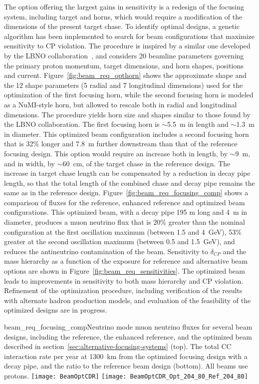 The option offering the largest gains in sensitivity is a redesign of
the focusing system, including target and horns, which would require a
modification of the dimensions of the present target chase.  To
identify optimal designs, a genetic algorithm has been implemented to
search for beam configurations that maximize sensitivity to CP
violation.  The procedure is inspired by a similar one developed by
the LBNO collaboration~\cite{Agarwalla:2014tca}, and considers 20
beamline parameters governing the primary proton momentum, target
dimensions, and horn shapes, positions and
current. Figure~\ref{fig:beam_req_opthorn} shows the approximate shape
and the 12 shape parameters (5 radial and 7 longitudinal dimensions)
used for the optimization of the first focusing horn, while the second
focusing horn is modeled as a NuMI-style horn, but allowed to rescale
both in radial and longitudinal dimensions. The procedure yields horn
size and shapes similar to those found by the LBNO collaboration. The
first focusing horn is $\sim$5.5~m in length and $\sim$1.3~m in
diameter. This optimized beam configuration includes a second focusing
horn that is 32\% longer and 7.8~m further downstream than that of the
reference focusing design.  This option would require an increase both
in length, by $\sim$9~m, and in width, by $\sim$60~cm, of the target
chase in the reference design. The increase in target chase length can
be compensated by a reduction in decay pipe length, so that the total
length of the combined chase and decay pipe remains the same as in the
reference design.
Figure~\ref{fig:beam_req_focusing_comp} shows a comparison of fluxes
for the reference, enhanced reference and optimized beam
configurations. This optimized beam, with a decay pipe 195 m long and
4~m in diameter, produces a muon neutrino flux that is 20\% greater
than the nominal configuration at the first oscillation maximum
(between 1.5 and 4~GeV), 53\% greater at the second oscillation
maximum (between 0.5 and 1.5~GeV), and reduces the antineutrino
contamination of the beam.  Sensitivity to $\delta_{CP}$ and the mass
hierarchy as a function of the exposure for reference and alternative
beam options are shown in Figure~\ref{fig:beam_req_sensitivities}.
The optimized beam leads to improvements in sensitivity to both mass
hierarchy and CP violation. Refinement of the optimization procedure,
including verification of the results with alternate hadron production
models, and evaluation of the feasibility of the optimized designs are
in progress.

\begin{cdrfigure}
{beam_req_focusing_comp}{Neutrino mode muon 
    neutrino fluxes for several beam designs, including the 
    reference, the enhanced reference, and the optimized beam
    described in section~\ref{sec:alternative-focusing-systems} (top). The total CC interaction rate per year at \SI{1300}{\km} from the optimized focusing design with a  decay pipe, and the ratio to the reference beam design (bottom).  
    All beams use  protons.}
  \texttt{[image: BeamOptCDR]}
  \texttt{[image: BeamOptCDR\_Opt\_204\_80\_Ref\_204\_80]}
\end{cdrfigure}

